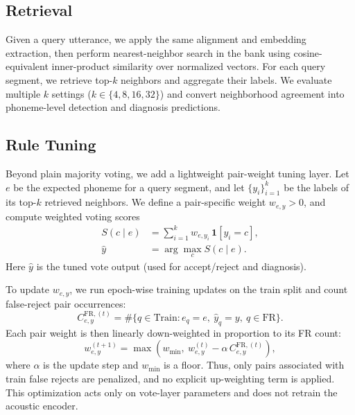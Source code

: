 \documentclass[11pt]{article}
\begin{document}
\subsection{Retrieval}
Given a query utterance, we apply the same alignment and embedding extraction, then perform nearest-neighbor search in the bank using cosine-equivalent inner-product similarity over normalized vectors. For each query segment, we retrieve top-$k$ neighbors and aggregate their labels. We evaluate multiple $k$ settings ($k\in\{4,8,16,32\}$) and convert neighborhood agreement into phoneme-level detection and diagnosis predictions.

\subsection{Rule Tuning}
Beyond plain majority voting, we add a lightweight pair-weight tuning layer. Let \(e\) be the expected phoneme for a query segment, and let \(\{y_i\}_{i=1}^k\) be the labels of its top-\(k\) retrieved neighbors. We define a pair-specific weight \(w_{e,y}>0\), and compute weighted voting scores
\begin{equation}
\begin{aligned}
S(c \mid e) &= \sum_{i=1}^{k} w_{e,y_i}\,\mathbf{1}[y_i=c],\\
\hat{y} &= \arg\max_{c} S(c \mid e).
\end{aligned}
\end{equation}
Here \(\hat{y}\) is the tuned vote output (used for accept/reject and diagnosis).

To update \(w_{e,y}\), we run epoch-wise training updates on the train split and count false-reject pair occurrences:
\begin{equation}
C_{e,y}^{\mathrm{FR},(t)}
=\#\{q\in \mathrm{Train}: e_q=e,\ \hat{y}_q=y,\ q\in \mathrm{FR}\}.
\end{equation}
Each pair weight is then linearly down-weighted in proportion to its FR count:
\begin{equation}
w_{e,y}^{(t+1)}=\max\!\left(w_{\min},\ w_{e,y}^{(t)}-\alpha\,C_{e,y}^{\mathrm{FR},(t)}\right),
\end{equation}
where \(\alpha\) is the update step and \(w_{\min}\) is a floor. Thus, only pairs associated with train false rejects are penalized, and no explicit up-weighting term is applied. This optimization acts only on vote-layer parameters and does not retrain the acoustic encoder.
\end{document}
